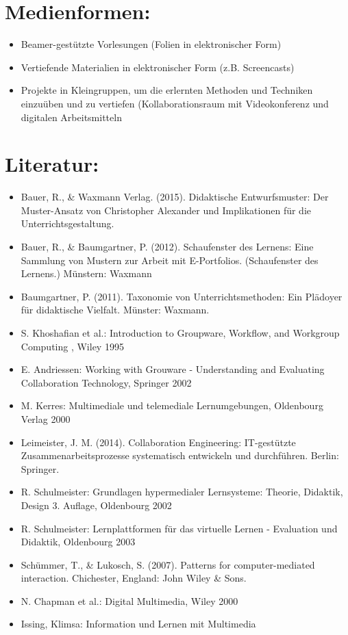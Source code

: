 \section*{Medienformen:}\label{medienformen-13}

\begin{itemize}
\tightlist
\item
  Beamer-gestützte Vorlesungen (Folien in elektronischer Form)
\item
  Vertiefende Materialien in elektronischer Form (z.B. Screencasts)
\item
  Projekte in Kleingruppen, um die erlernten Methoden und Techniken
  einzuüben und zu vertiefen (Kollaborationsraum mit Videokonferenz und
  digitalen Arbeitsmitteln
\end{itemize}

\section*{Literatur:}\label{literatur-13}

\begin{itemize}
\tightlist
\item
  Bauer, R., \& Waxmann Verlag. (2015). Didaktische Entwurfsmuster: Der
  Muster-Ansatz von Christopher Alexander und Implikationen für die
  Unterrichtsgestaltung.
\item
  Bauer, R., \& Baumgartner, P. (2012). Schaufenster des Lernens: Eine
  Sammlung von Mustern zur Arbeit mit E-Portfolios. (Schaufenster des
  Lernens.) Münstern: Waxmann
\item
  Baumgartner, P. (2011). Taxonomie von Unterrichtsmethoden: Ein
  Plädoyer für didaktische Vielfalt. Münster: Waxmann.
\item
  S. Khoshafian et al.: Introduction to Groupware, Workflow, and
  Workgroup Computing , Wiley 1995
\item
  E. Andriessen: Working with Grouware - Understanding and Evaluating
  Collaboration Technology, Springer 2002
\item
  M. Kerres: Multimediale und telemediale Lernumgebungen, Oldenbourg
  Verlag 2000
\item
  Leimeister, J. M. (2014). Collaboration Engineering: IT-gestützte
  Zusammenarbeitsprozesse systematisch entwickeln und durchführen.
  Berlin: Springer.
\item
  R. Schulmeister: Grundlagen hypermedialer Lernsysteme: Theorie,
  Didaktik, Design 3. Auflage, Oldenbourg 2002
\item
  R. Schulmeister: Lernplattformen für das virtuelle Lernen - Evaluation
  und Didaktik, Oldenbourg 2003
\item
  Schümmer, T., \& Lukosch, S. (2007). Patterns for computer-mediated
  interaction. Chichester, England: John Wiley \& Sons.
\item
  N. Chapman et al.: Digital Multimedia, Wiley 2000
\item
  Issing, Klimsa: Information und Lernen mit Multimedia
\end{itemize}

